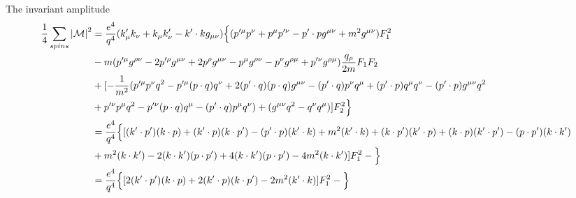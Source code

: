 \documentclass{article}
\begin{document}
The invariant amplitude
\begin{align*}
  \frac{1}{4}\sum_{spins}\abs{\mathcal{M}}^2&=\frac{e^4}{q^4}(k'_{\mu}k_{\nu}+k_{\mu}k'_{\nu}-k'\cdot kg_{\mu\nu})\Big\{(p'^{\mu}p^{\nu}+p^{\mu}p'^{\nu}-p'\cdot pg^{\mu\nu}+m^2g^{\mu\nu})F_1^2\\
  &-m(p'^{\mu}g^{\rho\nu}-2p'^{\rho}g^{\mu\nu}+2p^{\rho}g^{\mu\nu}-p^{\mu}g^{\rho\nu}-p^{\nu}g^{\rho\mu}+p'^{\nu}g^{\rho\mu})\frac{q_{\rho}}{2m}F_1F_2\\&+[-\frac{1}{m^2}(p'^{\mu}p^{\nu}q^2-p'^{\mu}(p\cdot q)q^{\nu}+2(p'\cdot q)(p\cdot q)g^{{\mu}{\nu}}-(p'\cdot q)p^{\nu}q^{\mu}+(p'\cdot p)q^{\mu}q^{\nu}-(p'\cdot p)g^{{\mu}{\nu}}q^2\\&+p'^{\nu}p^{\mu}q^2-p'^{\nu}(p\cdot q)q^{\mu}-(p'\cdot q)p^{\mu}q^{\nu})+(g^{\mu\nu}q^2-q^{\nu}q^{\mu})]F_2^2\Big\}\\
  &=\frac{e^4}{q^4}\Big\{ [(k'\cdot p')(k\cdot p)+(k'\cdot p)(k\cdot p')-(p'\cdot p)(k'\cdot k)+m^2(k'\cdot k)+(k\cdot p')(k'\cdot p)+(k\cdot p)(k'\cdot p')-(p\cdot p')(k\cdot k')\\&+m^2(k\cdot k')-2(k\cdot k')(p\cdot p')+4(k\cdot k')(p\cdot p')-4m^2(k\cdot k')]F_1^2-   \Big\}\\
  &=\frac{e^4}{q^4}\Big\{ [2(k'\cdot p')(k\cdot p)+2(k'\cdot p)(k\cdot p')-2m^2(k'\cdot k)]F_1^2-   \Big\}
\end{align*}
\end{document}
